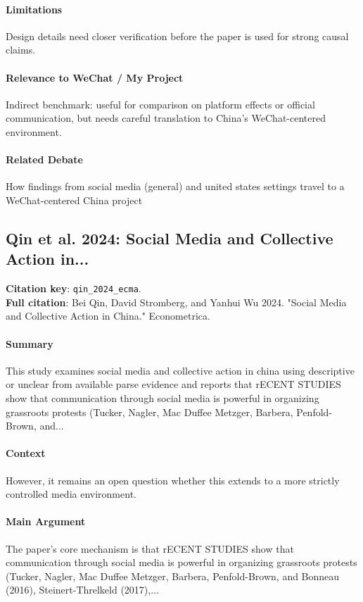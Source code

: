 \documentclass[12pt]{article}
\begin{document}
\paragraph{Limitations} Design details need closer verification before the paper is used for strong causal claims.

\paragraph{Relevance to WeChat / My Project} Indirect benchmark: useful for comparison on platform effects or official communication, but needs careful translation to China's WeChat-centered environment.

\paragraph{Related Debate} How findings from social media (general) and united states settings travel to a WeChat-centered China project


\subsection{Qin et al. 2024: Social Media and Collective Action in...}
\textbf{Citation key}: \texttt{qin\_2024\_ecma}.\\
\textbf{Full citation}: Bei Qin, David Stromberg, and Yanhui Wu 2024. "Social Media and Collective Action in China." Econometrica.

\paragraph{Summary} This study examines social media and collective action in china using descriptive or unclear from available parse evidence and reports that rECENT STUDIES show that communication through social media is powerful in organizing grassroots protests (Tucker, Nagler, Mac Duffee Metzger, Barbera, Penfold-Brown, and...

\paragraph{Context} However, it remains an open question whether this extends to a more strictly controlled media environment.

\paragraph{Main Argument} The paper's core mechanism is that rECENT STUDIES show that communication through social media is powerful in organizing grassroots protests (Tucker, Nagler, Mac Duffee Metzger, Barbera, Penfold-Brown, and Bonneau (2016), Steinert-Threlkeld (2017),...
\end{document}
